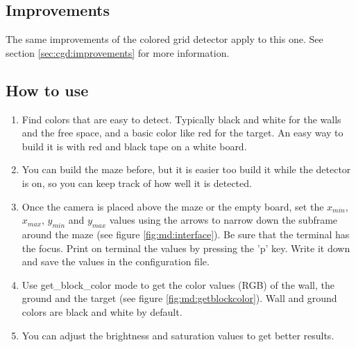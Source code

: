\subsection{Improvements}
\label{sec:md:improvements}

The same improvements of the colored grid detector apply to this one. 
See section \ref{sec:cgd:improvements} for more information.

\subsection{How to use}
\label{sec:md:howto}
    \begin{enumerate}
        \item Find colors that are easy to detect. Typically black and 
            white for the walls and the free space, and a basic color 
            like red for the target. An easy way to build it is with 
            red and black tape on a white board.
        \item You can build the maze before, but it is easier too build 
            it while the detector is on, so you can keep track of how 
            well it is detected.
        \item Once the camera is placed above the maze or the empty board, 
            set the $x_{min}$, $x_{max}$, $y_{min}$ and $y_{max}$
            values using the arrows to narrow 
            down the subframe around the maze
            (see figure \ref{fig:md:interface}). Be sure that the terminal 
            has the focus. Print on terminal the values by pressing
            the 'p' key. Write it down and 
            save the values in the configuration file.
        \item Use get\_block\_color mode to get the color values (RGB) 
            of the wall, the ground and the target (see 
            figure \ref{fig:md:getblockcolor}). Wall and ground 
            colors are black and white by default.
        \item You can adjust the brightness and saturation values to 
            get better results.
    \end{enumerate}

